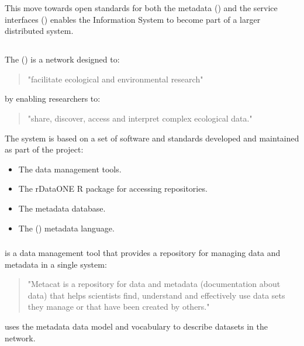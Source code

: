 \documentclass{article}
\begin{document}
This move towards open standards for both the metadata (\cite{eml}) and the
service interfaces (\cite{metacat}) enables the \cite{ppbio} Information
System to become part of a larger distributed system.

\subsection{}

The  ({\cite{knb}}) is a network designed to:

\begin{quote}
    "facilitate ecological and environmental research"
\end{quote}

by enabling researchers to:

\begin{quote}
    "share, discover, access and interpret complex ecological data."
\end{quote}

The \cite{knb} system is based on a set of \cite{open-source} software and
standards developed and maintained as part of the \cite{knb} project:

\begin{itemize}
    \item The \cite{morpho} data management tools.
    \item The rDataONE R package for accessing \cite{data-one} repositories.
    \item The \cite{metacat} metadata database.
    \item The  (\cite{eml}) metadata language.
\end{itemize}

\subsubsection{}

\cite{metacat} is a data management tool that provides a repository for
managing data and metadata in a single system:

\begin{quote}
"Metacat is a repository for data and metadata (documentation about data)
that helps scientists find, understand and effectively use data sets they
manage or that have been created by others."
\end{quote}

\cite{metacat} uses the \cite{eml} metadata data model and vocabulary to
describe datasets in the network.
\end{document}
